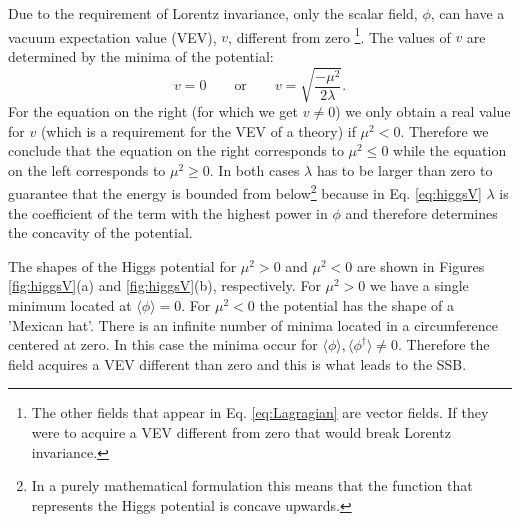 Due to the requirement of Lorentz invariance, only the scalar field, $\phi$, can have a vacuum expectation value (VEV), $v$, different from zero \footnote{The other fields that appear in Eq. \ref{eq:Lagragian} are vector fields. If they were to acquire a VEV different from zero that would break Lorentz invariance.}. The values of $v$ are determined by the minima of the potential:
\begin{equation}
v=0 \qquad \text{or} \qquad v=\sqrt{\frac{-\mu^2}{2\lambda}}.
\end{equation}
For the equation on the right (for which we get $v\neq 0$) we only obtain a real value for $v$ (which is a requirement for the VEV of a theory) if $\mu^2<0$. Therefore we conclude that the equation on the right corresponds to $\mu^2\leq0$ while the equation on the left corresponds to $\mu^2\geq0$. In both cases $\lambda$ has to be larger than zero to guarantee that the energy is bounded from below\footnote{In a purely mathematical formulation this means that the function that represents the Higgs potential is concave upwards.} because in Eq. \ref{eq:higgsV} $\lambda$ is the coefficient of the term with the highest power in $\phi$ and therefore determines the concavity of the potential. 

The shapes of the Higgs potential for $\mu^2>0$ and $\mu^2<0$ are shown in Figures \ref{fig:higgsV}(a) and \ref{fig:higgsV}(b), respectively. For $\mu^2>0$ we have a single minimum located at $\langle\phi\rangle=0$. For $\mu^2<0$ the potential has the shape of a 'Mexican hat'. There is an infinite number of minima located in a circumference centered at zero. In this case the minima occur for $\langle\phi\rangle,\langle\phi^{\dagger}\rangle\neq 0$. Therefore the field acquires a VEV different than zero and this is what leads to the SSB.


